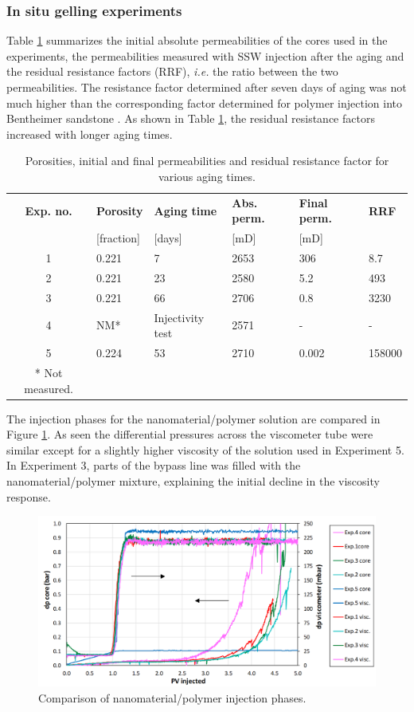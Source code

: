 \documentclass[nanomaterials,article,submit,moreauthors,pdftex]{Definitions/mdpi}
\begin{document}
\subsubsection{In situ gelling experiments \label{sec:insiteGel}}
Table \ref{tab:porPermAge} summarizes the initial absolute permeabilities of the cores used in the experiments, the permeabilities measured with SSW injection after the aging and the residual resistance factors (RRF), \textit{i.e.} the ratio between the two permeabilities. The resistance factor determined after seven days of aging was not much higher than the corresponding factor determined for polymer injection into Bentheimer sandstone \cite{Najafiazar2016}. As shown in Table \ref{tab:porPermAge}, the residual resistance factors increased with longer aging times.
\begin{table}[h!]
\small
\centering
\caption{Porosities, initial and final permeabilities and residual resistance factor for various aging times.}
\label{tab:porPermAge} %
\begin{tabular}{c l l l l l } 
\toprule
\textbf{Exp. no.} & \textbf{Porosity} & \textbf{Aging time} & \textbf{Abs. perm.} & \textbf{Final perm.} & \textbf{RRF} \\ 
 & [fraction] & [days] & [mD] & [mD] & \\
\midrule 
1  & 0.221   &  7     & 2653     & 306      & 8.7    \\
2  & 0.221   & 23     & 2580     & 5.2      & 493      \\ 
3  & 0.221   & 66     & 2706     & 0.8    & 3230   \\ 
4  & NM* & Injectivity test & 2571    & -        & -      \\
5  & 0.224   & 53     & 2710     & 0.002        & 158000      \\
\bottomrule
* Not measured.
\end{tabular}
\end{table}

The injection phases for the nanomaterial/polymer solution are compared in Figure \ref{cht:gelexp_sum}. As seen the differential pressures across the viscometer tube were similar except for a slightly higher viscosity of the solution used in Experiment 5. In Experiment 3, parts of the bypass line was filled with the nanomaterial/polymer mixture, explaining the initial decline in the viscosity response. 

\begin{figure}[h!]
    \centering
    \includegraphics[width=.8\textwidth]{fig/gelexp_sum.png}
    \caption{Comparison of nanomaterial/polymer injection phases.}
    \label{cht:gelexp_sum} %
\end{figure}
 
\end{document}
